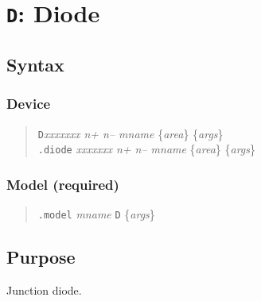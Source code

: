 %
%
%
%
\section{{\tt D}: Diode}
\subsection{Syntax}
\subsubsection{Device}
\begin{verse}
{\tt D}{\it xxxxxxx n+ n-- mname} \{{\it area}\} \{{\it args}\}\\
{\tt .diode} {\it xxxxxxx n+ n-- mname} \{{\it area}\}
	\{{\it args}\}
\end{verse}
\subsubsection{Model (required)}
\begin{verse}
{\tt .model} {\it mname} {\tt D} \{{\it args}\}
\end{verse}
\subsection{Purpose}

Junction diode.
